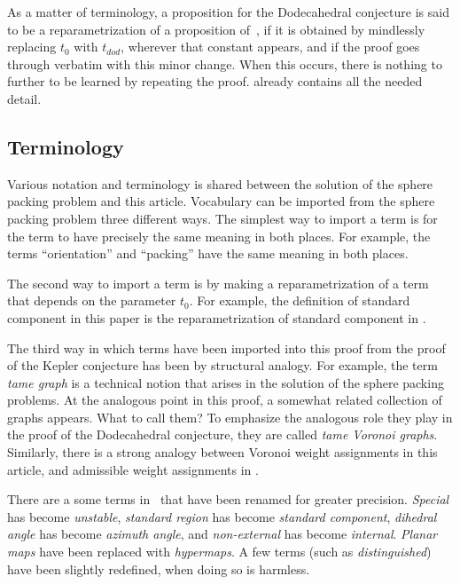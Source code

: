\documentclass{article} %
\begin{document}
As a matter of terminology, a proposition for the Dodecahedral
conjecture is said to be a reparametrization of a proposition
of~\cite{Hales:2006:DCG}, if it is obtained by mindlessly replacing
$t_0$ with $t_{dod}$, wherever that constant appears, and if the proof
goes through verbatim with this minor change. When this occurs, there
is nothing to further to be learned by repeating the proof.
\cite{Hales:2006:DCG} already contains all the needed detail.

\subsection{Terminology}

Various notation and terminology is shared between the solution of the
sphere packing problem and this article. Vocabulary can be imported
from the sphere packing problem three different ways. The simplest way
to import a term is for the term to have precisely the same meaning in
both places. For example, the terms ``orientation'' and ``packing''
have the same meaning in both places.

The second way to import a term is by making a reparametrization of a
term that depends on the parameter $t_0$. For example, the definition
of standard component in this paper is the reparametrization of
standard component in \cite{Hales:2006:DCG}.

The third way in which terms have been imported into this proof from
the proof of the Kepler conjecture has been by structural analogy. For
example, the term {\it tame graph} is a technical notion that arises
in the solution of the sphere packing problems. At the analogous point
in this proof, a somewhat related collection of graphs appears. What
to call them? To emphasize the analogous role they play in the proof
of the Dodecahedral conjecture, they are called {\it tame Voronoi
graphs}. Similarly, there is a strong analogy between Voronoi weight
assignments in this article, and admissible weight assignments in
\cite{Hales:2006:DCG}. %

There are a some terms in~\cite{website:arXiv} that have been renamed for
greater precision. {\it Special} has become {\it unstable}, {\it
standard region} has become {\it standard component}, {\it dihedral
angle} has become {\it azimuth angle}, and {\it non-external} has
become {\it internal}. {\it Planar maps} have been replaced with {\it
hypermaps}. A few terms (such as {\it distinguished}) have been
slightly redefined, when doing so is harmless.
\end{document}
